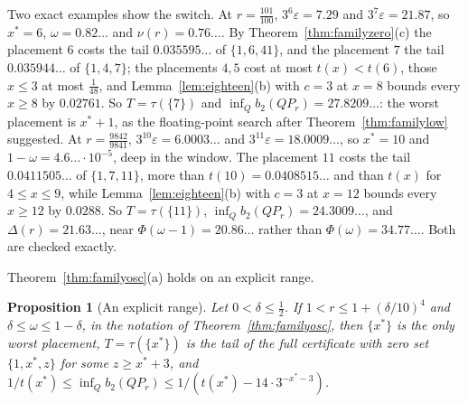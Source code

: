 \documentclass[11pt]{article}
\newtheorem{proposition}[theorem]{Proposition}
\begin{document}
Two exact examples show the switch.  At $r=\tfrac{101}{100}$,
$3^6\varepsilon=7.29$ and $3^7\varepsilon=21.87$, so $x^*=6$, $\omega=0.82\ldots$
and $\nu(r)=0.76\ldots$.  By Theorem~\ref{thm:familyzero}(c) the placement
$6$ costs the tail $0.035595\ldots$ of $\{1,6,41\}$, and the placement $7$
the tail $0.035944\ldots$ of $\{1,4,7\}$; the placements $4,5$ cost at most
$t(x)<t(6)$, those $x\le3$ at most $\tfrac1{48}$, and
Lemma~\ref{lem:eighteen}(b) with $c=3$ at $x=8$ bounds every $x\ge8$ by
$0.02761$.  So $T=\tau(\{7\})$ and $\inf_Qb_2(QP_r)=27.8209\ldots$: the
worst placement is $x^*+1$, as the floating-point search after
Theorem~\ref{thm:familylow} suggested.  At
$r=\tfrac{9842}{9841}$, $3^{10}\varepsilon=6.0003\ldots$ and
$3^{11}\varepsilon=18.0009\ldots$, so $x^*=10$ and $1-\omega=4.6\ldots\cdot10^{-5}$,
deep in the window.  The placement $11$ costs the tail $0.0411505\ldots$ of
$\{1,7,11\}$, more than $t(10)=0.0408515\ldots$ and than $t(x)$ for
$4\le x\le9$, while Lemma~\ref{lem:eighteen}(b) with $c=3$ at $x=12$ bounds
every $x\ge12$ by $0.0288$.  So $T=\tau(\{11\})$,
$\inf_Qb_2(QP_r)=24.3009\ldots$, and $\Delta(r)=21.63\ldots$, near
$\Phi(\omega-1)=20.86\ldots$ rather than $\Phi(\omega)=34.77\ldots$.  Both are
checked exactly.

Theorem~\ref{thm:familyosc}(a) holds on an explicit range.

\begin{proposition}[An explicit range]\label{prop:familyrdelta}
Let $0<\delta\le\tfrac12$.  If $1<r\le1+(\delta/10)^4$ and
$\delta\le\omega\le1-\delta$, in the notation of
Theorem~\ref{thm:familyosc}, then $\{x^*\}$ is the only worst placement,
$T=\tau(\{x^*\})$ is the tail of the full certificate with zero set
$\{1,x^*,z\}$ for some $z\ge x^*+3$, and
$1/t(x^*)\le\inf_Qb_2(QP_r)\le1/(t(x^*)-14\cdot3^{-x^*-3})$.
\end{proposition}
\end{document}
